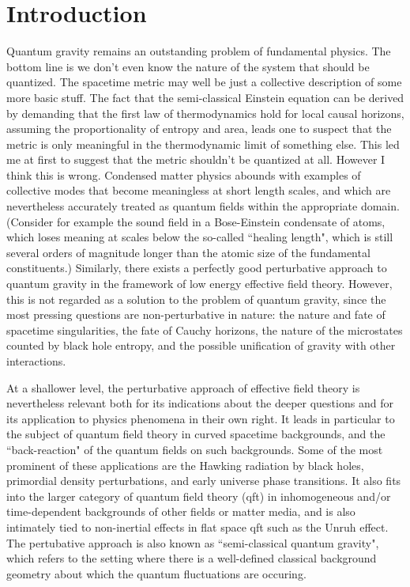 \documentclass[12pt]{article}
\newcommand{\sect}[1]{\section{#1}\setcounter{equation}{0}}
\begin{document}
\newpage

\tableofcontents

\newpage

\sect{Introduction}
\label{Intro}

Quantum gravity remains an outstanding problem of fundamental
physics. The bottom line is we don't even know the nature
of the system that should be quantized. The spacetime
metric may well be just a collective description of some more basic
stuff. The fact\cite{tos} that the semi-classical Einstein equation can be
derived by demanding that the first law of thermodynamics
hold for local causal horizons, assuming the proportionality
of entropy and area, leads one to suspect that the metric is
only meaningful in the thermodynamic limit of something else.
This led me at first to suggest that the metric shouldn't be
quantized at all. However I think this is wrong. Condensed matter
physics abounds with examples of collective modes that become
meaningless at short length scales, and which are nevertheless
accurately treated as quantum fields within the appropriate domain.
(Consider for example the sound field in a Bose-Einstein condensate
of atoms, which loses meaning at scales below the so-called
``healing length",
which is still several orders of magnitude longer than the atomic
size of the fundamental constituents.)
Similarly,
there exists a perfectly good perturbative approach to quantum
gravity in the framework of low energy effective field theory\cite{Donoghue:1997hx}.
However, this is not regarded as a solution to the problem of quantum
gravity, since the most pressing questions are non-perturbative in nature:
the nature and fate of spacetime singularities, the fate of Cauchy horizons,
the nature of the microstates counted by black hole entropy, 
and the possible
unification of gravity with other interactions.

At a shallower level,
the perturbative approach of effective field theory
is nevertheless relevant both for its indications about
the deeper questions and for its application to physics
phenomena in their own right. It
leads in particular to the subject of quantum
field theory in curved spacetime backgrounds,
and the ``back-reaction" of the quantum fields on such
backgrounds. Some of the most prominent of these
applications are the Hawking radiation by black holes,
primordial density perturbations, and early universe phase transitions.
It also fits into the larger category of quantum field theory (qft) 
in inhomogeneous
and/or time-dependent backgrounds of other fields or
matter media, and is also intimately tied to non-inertial
effects in flat space qft such as the Unruh effect.
The pertubative approach is also known as ``semi-classical
quantum gravity", which refers to the setting where there
is a well-defined classical background geometry about which
the quantum fluctuations are occuring.
\end{document}
